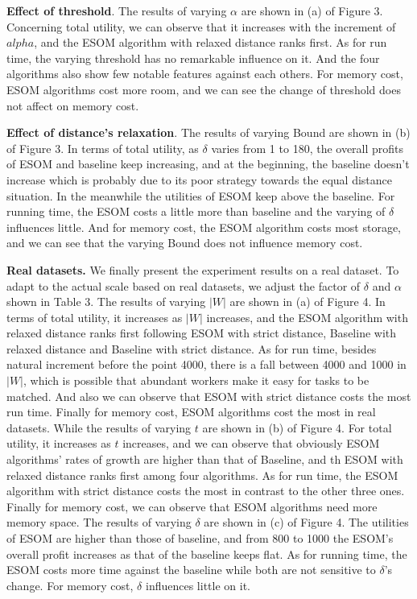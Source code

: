 \documentclass[color,twoside,amssymb,twocolumn]{article}
\begin{document}
\textbf{Effect of threshold}. The results of varying $\alpha$ are shown in (a) of Figure 3. Concerning total utility, we can observe that it increases with the increment of $alpha$, and the ESOM algorithm with relaxed distance ranks first. As for run time, the varying threshold has no remarkable influence on it. And the four algorithms also show few notable features against each others. For memory cost, ESOM algorithms cost more room, and we can see the change of threshold does not affect on memory cost.

\textbf{Effect of distance's relaxation}. The results of varying Bound are shown in (b) of Figure 3. In terms of total utility, as $\delta$ varies from 1 to 180, the overall profits of ESOM and baseline keep increasing, and at the beginning, the baseline doesn't increase which is probably due to its poor strategy towards the equal distance situation. In the meanwhile the utilities of ESOM keep above the baseline. For running time, the ESOM costs a little more than baseline and the varying of $\delta$ influences little. And for memory cost, the ESOM algorithm costs most storage, and we can see that the varying Bound does not influence memory cost.

\textbf{Real datasets.} We finally present the experiment results on a real dataset. To adapt to the actual scale based on real datasets, we adjust the factor of $\delta$ and $\alpha$ shown in Table 3. The results of varying $|W|$ are shown in (a) of Figure 4. In terms of total utility, it increases as $|W|$ increases, and the ESOM algorithm with relaxed distance ranks first following ESOM with strict distance, Baseline with relaxed distance and Baseline with strict distance. As for run time,
besides natural increment before the point 4000, there is a fall between 4000 and 1000 in $|W|$, which is possible that abundant workers make it easy for tasks to be matched. And also we can observe that ESOM with strict distance costs the most run time. Finally for memory cost, ESOM algorithms cost the most in real datasets. While the results of varying $t$ are shown in (b) of Figure 4. For total utility, it increases as $t$ increases, and we can observe that obviously ESOM algorithms' rates of growth are higher than that of Baseline, and th ESOM with relaxed distance ranks first among four algorithms. As for run time, the ESOM algorithm with strict distance costs the most in contrast to the other three ones. Finally for memory cost, we can observe that ESOM algorithms need more memory space. The results of varying $\delta$ are shown in (c) of Figure 4. The utilities of ESOM are higher than those of baseline, and from 800 to 1000 the ESOM's overall profit increases as that of the baseline keeps flat. As for running time, the ESOM costs more time against the baseline while both are not sensitive to $\delta$'s change. For memory cost, $\delta$ influences little on it.
\end{document}
